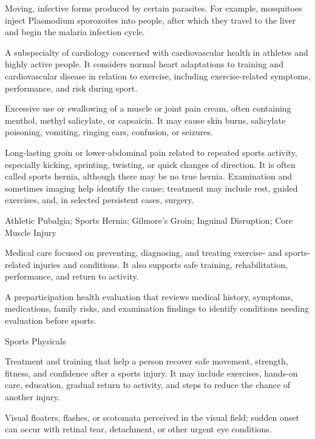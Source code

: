  Moving, infective forms produced by certain parasites. For example, mosquitoes inject Plasmodium sporozoites into people, after which they travel to the liver and begin the malaria infection cycle.

 A subspecialty of cardiology concerned with cardiovascular health in athletes and highly active people. It considers normal heart adaptations to training and cardiovascular disease in relation to exercise, including exercise-related symptoms, performance, and risk during sport.

 Excessive use or swallowing of a muscle or joint pain cream, often containing menthol, methyl salicylate, or capsaicin. It may cause skin burns, salicylate poisoning, vomiting, ringing ears, confusion, or seizures.

 Long-lasting groin or lower-abdominal pain related to repeated sports activity, especially kicking, sprinting, twisting, or quick changes of direction. It is often called sports hernia, although there may be no true hernia. Examination and sometimes imaging help identify the cause; treatment may include rest, guided exercises, and, in selected persistent cases, surgery.

\synonyms
Athletic Pubalgia; Sports Hernia; Gilmore's Groin; Inguinal Disruption; Core Muscle Injury

 Medical care focused on preventing, diagnosing, and treating exercise- and sports-related injuries and conditions. It also supports safe training, rehabilitation, performance, and return to activity.

 A preparticipation health evaluation that reviews medical history, symptoms, medications, family risks, and examination findings to identify conditions needing evaluation before sports.

\synonyms
Sports Physicals

 Treatment and training that help a person recover safe movement, strength, fitness, and confidence after a sports injury. It may include exercises, hands-on care, education, gradual return to activity, and steps to reduce the chance of another injury.

 Visual floaters, flashes, or scotomata perceived in the visual field; sudden onset can occur with retinal tear, detachment, or other urgent eye conditions.

